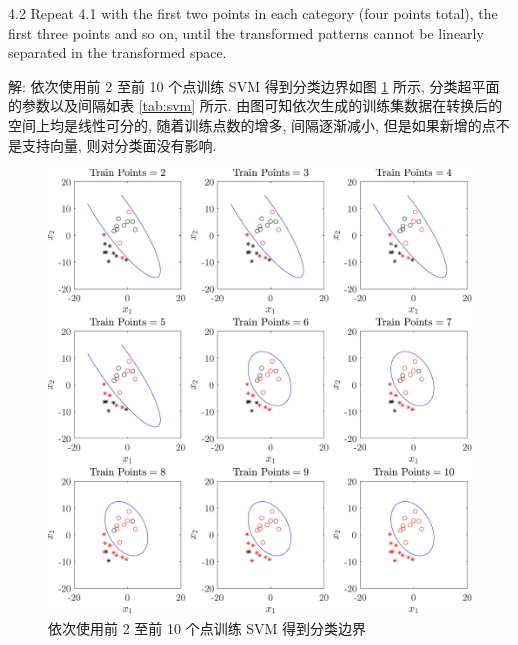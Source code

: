 \documentclass{article}
\begin{document}
4.2 Repeat 4.1 with the first two points in each category (four points total), the first three points and so on, until the transformed patterns cannot be linearly separated in the transformed space.

解: 依次使用前 2 至前 10 个点训练 SVM 得到分类边界如图 \ref{fig:svm2} 所示, 分类超平面的参数以及间隔如表 \ref{tab:svm} 所示. 由图可知依次生成的训练集数据在转换后的空间上均是线性可分的, 随着训练点数的增多, 间隔逐渐减小, 但是如果新增的点不是支持向量, 则对分类面没有影响.

\begin{figure}[htbp]
  \centering
  \includegraphics[width=16cm]{svmPoint2-10.pdf}
  \caption{依次使用前 2 至前 10 个点训练 SVM 得到分类边界}
  \label{fig:svm2}
\end{figure}

\end{document}
